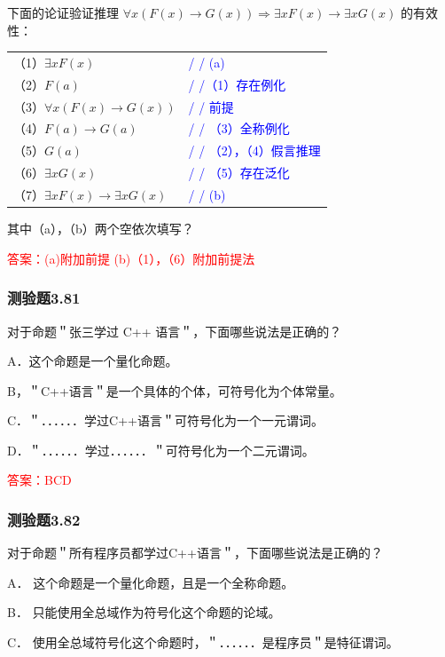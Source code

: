 \documentclass[UTF8, heading=true]{ctexart}
\begin{document}
下面的论证验证推理 $\forall x(F(x) \rightarrow G(x)) \Longrightarrow \exists x F(x) \rightarrow \exists x G(x)$ 的有效性：
\begin{table}[htbp]
  \centering
  \renewcommand{\arraystretch}{1.5}
\begin{tabular}{ll}
（1）$\exists x F(x)$ & \textcolor{blue}{/ / (a)} \\
（2）$F(a)$ & \textcolor{blue}{/ /（1）存在例化} \\
（3）$\forall x(F(x) \rightarrow G(x))$ & \textcolor{blue}{/ / 前提} \\
（4）$F(a) \rightarrow G(a)$ & \textcolor{blue}{/ / （3）全称例化} \\
（5）$G(a)$ & \textcolor{blue}{/ / （2），（4）假言推理} \\
（6）$\exists x G(x)$ & \textcolor{blue}{/ / （5）存在泛化} \\
（7）$\exists x F(x) \rightarrow \exists x G(x)$ & \textcolor{blue}{/ / (b)}
\end{tabular}
\end{table}

其中（a），（b）两个空依次填写？

\textcolor{red}{答案：(a)附加前提 (b)（1），（6）附加前提法}

\subsubsection{测验题3.81}

对于命题＂张三学过 C++ 语言＂，下面哪些说法是正确的？

A．这个命题是一个量化命题。

B，＂C++语言＂是一个具体的个体，可符号化为个体常量。

C．＂．．．．．．学过C++语言＂可符号化为一个一元谓词。

D．＂．．．．．．学过．．．．．．＂可符号化为一个二元谓词。

\textcolor{red}{答案：BCD}

\subsubsection{测验题3.82}

对于命题＂所有程序员都学过C++语言＂，下面哪些说法是正确的？

A．
这个命题是一个量化命题，且是一个全称命题。

B．
只能使用全总域作为符号化这个命题的论域。

C．
使用全总域符号化这个命题时，＂．．．．．．是程序员＂是特征谓词。
\end{document}
